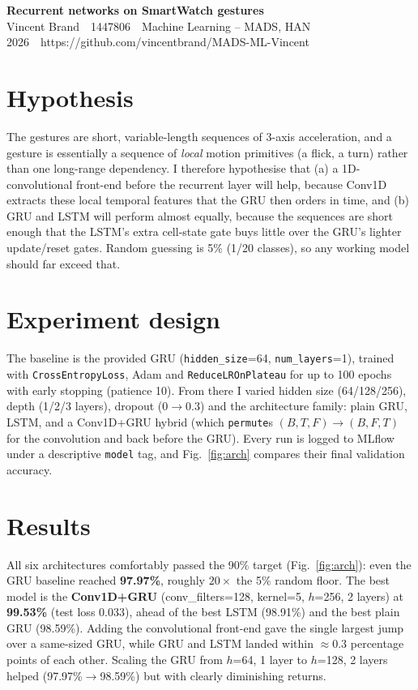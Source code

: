 \documentclass[11pt,a4paper]{article}
\newcommand{\studentname}{Vincent Brand}
\newcommand{\studentnumber}{1447806}
\newcommand{\course}{Machine Learning -- MADS, HAN}
\newcommand{\reportdate}{2026}
\newcommand{\repourl}{https://github.com/vincentbrand/MADS-ML-Vincent}
\begin{document}
\begin{center}
  {\Large\bfseries Recurrent networks on SmartWatch gestures}\\[3pt]
  \studentname\ \textbar\ \studentnumber\ \textbar\ \course\\
  \reportdate\ \textbar\ \repourl
\end{center}

\section{Hypothesis}
The gestures are short, variable-length sequences of 3-axis acceleration, and a
gesture is essentially a sequence of \emph{local} motion primitives (a flick, a
turn) rather than one long-range dependency. I therefore hypothesise that (a) a
1D-convolutional front-end before the recurrent layer will help, because Conv1D
extracts these local temporal features that the GRU then orders in time, and (b)
GRU and LSTM will perform almost equally, because the sequences are short enough
that the LSTM's extra cell-state gate buys little over the GRU's lighter
update/reset gates. Random guessing is 5\% (1/20 classes), so any working model
should far exceed that.

\section{Experiment design}
The baseline is the provided GRU (\texttt{hidden\_size}=64, \texttt{num\_layers}=1),
trained with \texttt{CrossEntropyLoss}, Adam and \texttt{ReduceLROnPlateau} for up
to 100 epochs with early stopping (patience 10). From there I varied hidden size
(64/128/256), depth (1/2/3 layers), dropout ($0\to0.3$) and the architecture
family: plain GRU, LSTM, and a Conv1D+GRU hybrid (which \texttt{permute}s
$(B,T,F)\!\to\!(B,F,T)$ for the convolution and back before the GRU). Every run is
logged to MLflow under a descriptive \texttt{model} tag, and Fig.~\ref{fig:arch}
compares their final validation accuracy.

\section{Results}
All six architectures comfortably passed the 90\% target (Fig.~\ref{fig:arch}):
even the GRU baseline reached \textbf{97.97\%}, roughly $20\times$ the 5\% random
floor. The best model is the \textbf{Conv1D+GRU} (conv\_filters=128, kernel=5,
$h$=256, 2 layers) at \textbf{99.53\%} (test loss 0.033), ahead of the best LSTM
(98.91\%) and the best plain GRU (98.59\%). Adding the convolutional front-end
gave the single largest jump over a same-sized GRU, while GRU and LSTM landed
within $\approx0.3$ percentage points of each other. Scaling the GRU from $h$=64,
1 layer to $h$=128, 2 layers helped (97.97\%$\to$98.59\%) but with clearly
diminishing returns.
\end{document}
